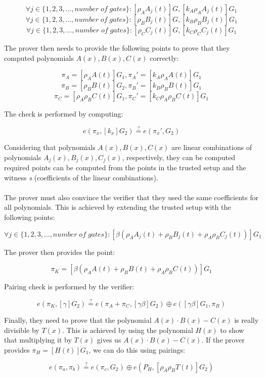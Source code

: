 $$\forall j \in \{1, 2, 3, \ldots, number\;of\;gates\} : [\rho_A A_j(t)]G, [k_A \rho_A A_j(t)]G_1 $$
$$\forall j \in \{1, 2, 3, \ldots, number\;of\;gates\} : [\rho_B B_j(t)]G, [k_B \rho_B B_j(t)]G_1 $$ 
$$\forall j \in \{1, 2, 3, \ldots, number\;of\;gates\} : [\rho_C C_j(t)]G, [k_C \rho_C C_j(t)]G_1 $$ 

The prover then needs to provide the following points to prove that they computed polynomials $A(x), B(x), C(x)$ correctly:

$$\pi_A = [\rho_A A(t)]G_1, \pi_A' = [k_A \rho_A A(t)]G_1$$
$$\pi_B = [\rho_B B(t)]G_2, \pi_B' = [k_B \rho_B B(t)]G_1$$
$$\pi_C = [\rho_A \rho_B C(t)]G_1, \pi_C' = [k_C \rho_A \rho_B C(t)]G_1$$

The check is performed by computing:

$$ e(\pi_x, [k_x]G_2) \stackrel{?}{=} e(\pi_x', G_2) $$

Considering that polynomials $A(x), B(x), C(x)$ are linear combinations of polynomials $A_j(x), B_j(x), C_j(x)$, respectively, they can be computed required points can be computed from the points in the trusted setup and the witness \textit{s} (coefficients of the linear combinations).\\
\\
The prover must also convince the verifier that they used the same coefficients for all polynomials. This is achieved by extending the trusted setup with the following points:

$$\forall j \in \{1, 2, 3, \ldots, number\;of\;gates\} : [\beta(\rho_A A_j(t) + \rho_B B_j(t) + \rho_A \rho_B C_j(t))]G_1 $$

The prover then provides the point:

$$ \pi_{K} = [\beta(\rho_A A(t) + \rho_B B(t) + \rho_A \rho_B C(t))]G_1 $$

Pairing check is performed by the verifier:

$$ e(\pi_K, [\gamma]G_2) \stackrel{?}{=} e(\pi_A + \pi_C, [\gamma\beta]G_2) \oplus e([\gamma\beta]G_1, \pi_B) $$

Finally, they need to prove that the polynomial $A(x) \cdot B(x) - C(x)$ is really divisible by $T(x)$. This is achieved by using the polynomial $H(x)$ to show that multiplying it by $T(x)$ gives us $A(x) \cdot B(x) - C(x)$. If the prover provides $\pi_H = [H(t)]G_1$, we can do this using pairings:

$$ e(\pi_a, \pi_b) \stackrel{?}{=} e(\pi_c, G_2) \oplus e(P_H, [\rho_A \rho_B T(t)]G_2) $$

